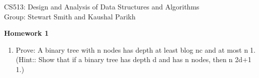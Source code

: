 \documentclass[11pt]{article}
\begin{document}
\sloppy

\noindent CS513: Design and Analysis of Data Structures and Algorithms \\
Group: Stewart Smith and Kaushal Parikh\\

\begin{center}
\LARGE{\textbf{Homework 1}}\\
\end{center}

\vspace{.1in}

\begin{enumerate}


\item Prove: A binary tree with n nodes has depth at least blog nc and at most n􀀀1. (Hint:: Show that if a binary tree has depth d and has n nodes, then n  2d+1 􀀀 1.) 
\end{enumerate}
\end{document}
